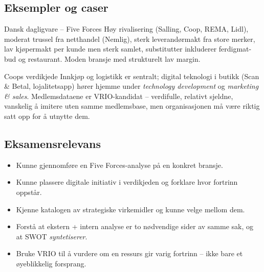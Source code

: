 \subsection{Eksempler og caser}
\begin{eksempelboks}{Dansk dagligvare -- Five Forces}
Høy rivalisering (Salling, Coop, REMA, Lidl), moderat trussel fra netthandel
(Nemlig), sterk leverandørmakt fra store merker, lav kjøpermakt per kunde men
sterk samlet, substitutter inkluderer ferdigmat-bud og restaurant. Moden
bransje med strukturelt lav margin.
\end{eksempelboks}

\begin{eksempelboks}{Coops verdikjede}
Innkjøp og logistikk er sentralt; digital teknologi i butikk (Scan \& Betal,
lojalitetsapp) hører hjemme under \emph{technology development} og
\emph{marketing \& sales}. Medlemsdataene er VRIO-kandidat -- verdifulle,
relativt sjeldne, vanskelig å imitere uten samme medlemsbase, men
organisasjonen må være riktig satt opp for å utnytte dem.
\end{eksempelboks}

\subsection{Eksamensrelevans}
\begin{itemize}
  \item Kunne gjennomføre en Five Forces-analyse på en konkret bransje.
  \item Kunne plassere digitale initiativ i verdikjeden og forklare hvor
    fortrinn oppstår.
  \item Kjenne katalogen av strategiske virkemidler og kunne velge mellom dem.
  \item Forstå at ekstern + intern analyse er to nødvendige sider av samme sak,
    og at SWOT \emph{syntetiserer}.
  \item Bruke VRIO til å vurdere om en ressurs gir varig fortrinn -- ikke
    bare et øyeblikkelig forsprang.
\end{itemize}
